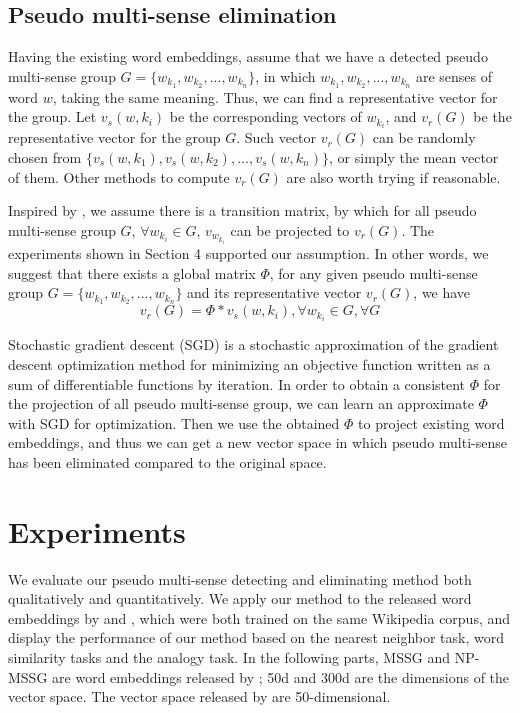 \documentclass[11pt]{article}
\begin{document}
\subsection{Pseudo multi-sense elimination}
\par
Having the existing word embeddings, assume that we have a detected pseudo multi-sense group $G = \{w_{k_1}, w_{k_2}, ... , w_{k_n}\}$, in which $w_{k_1}, w_{k_2}, ... , w_{k_n}$ are senses of word $w$, taking the same meaning. Thus, we can find a representative vector for the group. Let $v_s(w,k_i)$ be the corresponding vectors of $w_{k_i}$, and $v_r(G)$ be the representative vector for the group $G$. Such vector $v_r(G)$ can be randomly chosen from $\{v_s(w,k_1), v_s(w,k_2), ..., v_s(w,k_n)\}$, or simply the mean vector of them. Other methods to compute $v_r(G)$ are also worth trying if reasonable. 
\par
Inspired by , we assume there is a transition matrix, by which for all pseudo multi-sense group $G$, $\forall w_{k_i} \in G$, $v_{w_{k_i}}$ can be projected to $v_r(G)$. The experiments shown in Section 4 supported our assumption. In other words, we suggest that there exists a global matrix $\Phi$, for any given pseudo multi-sense group $G = \{w_{k_1}, w_{k_2}, ... , w_{k_n}\}$ and its representative vector $v_r(G)$, we have
\begin{equation}
v_r(G) = \Phi * v_s(w, k_i), \forall w_{k_i} \in G, \forall G
\end{equation}
\par
Stochastic gradient descent (SGD) is a stochastic approximation of the gradient descent optimization method for minimizing an objective function written as a sum of differentiable functions by iteration. In order to obtain a consistent $\Phi$ for the projection of all pseudo multi-sense group, we can learn an approximate $\Phi$ with SGD for optimization. Then we  use the obtained $\Phi$ to project existing word embeddings, and thus we can get a new vector space in which pseudo multi-sense has been eliminated compared to the original space.


\section{Experiments}
\par 
We evaluate our pseudo multi-sense detecting and eliminating method both qualitatively and quantitatively. We apply our method to the released word embeddings by  and , which were both trained on the same Wikipedia corpus, and display the performance of our method based on the nearest neighbor task, word similarity tasks and the analogy task. In the following parts, MSSG and NP-MSSG are word embeddings released by ; 50d and 300d are the dimensions of the vector space. The vector space released by  are 50-dimensional.
\end{document}
